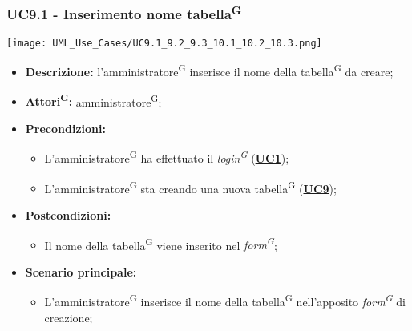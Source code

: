 \subsubsection{UC9.1 - Inserimento nome tabella\textsuperscript{G}}
\label{sec:UC9.1}
\texttt{[image: UML\_Use\_Cases/UC9.1\_9.2\_9.3\_10.1\_10.2\_10.3.png]}
\begin{itemize}
	\item \textbf{Descrizione:} l’amministratore\textsuperscript{G} inserisce il nome della tabella\textsuperscript{G} da creare;
	\item \textbf{Attori\textsuperscript{G}:} amministratore\textsuperscript{G};
	\item \textbf{Precondizioni:} 
	\begin{itemize}
		\item L’amministratore\textsuperscript{G} ha effettuato il \textit{login\textsuperscript{G}} (\hyperref[sec:UC1]{\textbf{UC1}});
		\item L’amministratore\textsuperscript{G} sta creando una nuova tabella\textsuperscript{G} (\hyperref[sec:UC9]{\textbf{UC9}});
	\end{itemize}
	\item \textbf{Postcondizioni:} 
	\begin{itemize}
		\item Il nome della tabella\textsuperscript{G} viene inserito nel \textit{form\textsuperscript{G}};
	\end{itemize}
	\item \textbf{Scenario principale:} 
	\begin{itemize}
		\item L’amministratore\textsuperscript{G} inserisce il nome della tabella\textsuperscript{G} nell'apposito \textit{form\textsuperscript{G}} di creazione;
	\end{itemize}
\end{itemize}

